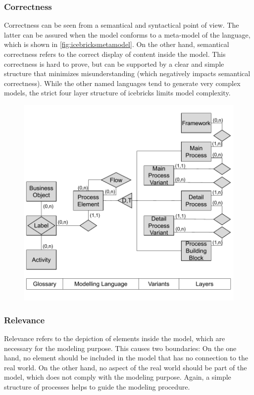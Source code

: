	 
	 \subsubsection{Correctness}
	 Correctness can be seen from a semantical and syntactical point of view. The latter can be assured when the model conforms to a meta-model of the language, which is shown in \Fig \ref{fig:icebricksmetamodel}. On the other hand, semantical correctness refers to the correct display of content inside the model. This correctness is hard to prove, but can be supported by a clear and simple structure that minimizes misunderstanding (which negatively impacts semantical correctness). While the other named languages tend to generate very complex models, the strict four layer structure of icebricks limits model complexity. 
	 
	 	 \begin{figure}[caption={icebricks meta model}, label={fig:icebricksmetamodel}]
	 	{	\includegraphics[width=.8\textwidth]{figures/icebricksmetamodel.pdf} \\ \parbox{0.8\textwidth}{}
 	}
	 
	 \end{figure} 
 
	 \subsubsection{Relevance}
	 Relevance refers to the depiction of elements inside the model, which are necessary for the modeling purpose. This causes two boundaries: On the one hand, no element should be included in the model that has no connection to the real world. On the other hand, no aspect of the real world should be part of the model, which does not comply with the modeling purpose. Again, a simple structure of processes helps to guide the modeling procedure. 
	 
